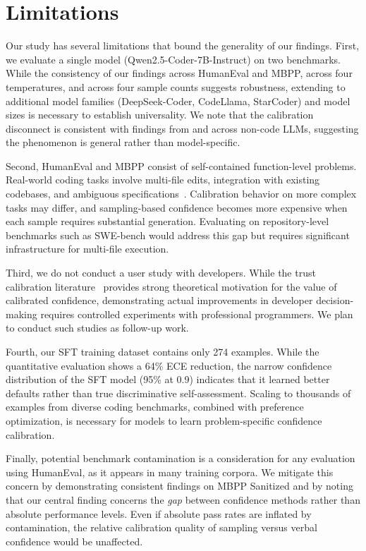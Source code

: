 \documentclass{article}
\begin{document}
\section{Limitations}
\label{sec:limitations}

Our study has several limitations that bound the generality of our findings. First, we evaluate a single model (Qwen2.5-Coder-7B-Instruct) on two benchmarks. While the consistency of our findings across HumanEval and MBPP, across four temperatures, and across four sample counts suggests robustness, extending to additional model families (DeepSeek-Coder, CodeLlama, StarCoder) and model sizes is necessary to establish universality. We note that the calibration disconnect is consistent with findings from \citet{xiong2024can} and \citet{tian2023just} across non-code LLMs, suggesting the phenomenon is general rather than model-specific.

Second, HumanEval and MBPP consist of self-contained function-level problems. Real-world coding tasks involve multi-file edits, integration with existing codebases, and ambiguous specifications~\citep{jimenez2024swe}. Calibration behavior on more complex tasks may differ, and sampling-based confidence becomes more expensive when each sample requires substantial generation. Evaluating on repository-level benchmarks such as SWE-bench would address this gap but requires significant infrastructure for multi-file execution.

Third, we do not conduct a user study with developers. While the trust calibration literature~\citep{lee2004trust, yin2019understanding} provides strong theoretical motivation for the value of calibrated confidence, demonstrating actual improvements in developer decision-making requires controlled experiments with professional programmers. We plan to conduct such studies as follow-up work.

Fourth, our SFT training dataset contains only 274 examples. While the quantitative evaluation shows a 64\% ECE reduction, the narrow confidence distribution of the SFT model (95\% at 0.9) indicates that it learned better defaults rather than true discriminative self-assessment. Scaling to thousands of examples from diverse coding benchmarks, combined with preference optimization, is necessary for models to learn problem-specific confidence calibration.

Finally, potential benchmark contamination is a consideration for any evaluation using HumanEval, as it appears in many training corpora. We mitigate this concern by demonstrating consistent findings on MBPP Sanitized and by noting that our central finding concerns the \emph{gap} between confidence methods rather than absolute performance levels. Even if absolute pass rates are inflated by contamination, the relative calibration quality of sampling versus verbal confidence would be unaffected.
\end{document}
